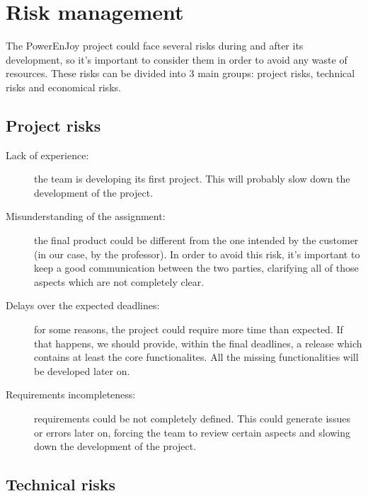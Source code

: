 \section{Risk management}

The PowerEnJoy project could face several risks during and after its development, so it's important to consider them in order to avoid any waste of resources. These risks can be divided into 3 main groups: project risks, technical risks and economical risks.

\subsection {Project risks}

\begin{description}
	\item [Lack of experience: ] the team is developing its first project. This will probably slow down the development of the project.
	\item [Misunderstanding of the assignment: ] the final product could be different from the one intended by the customer (in our case, by the professor). In order to avoid this risk, it's important to keep a good communication between the two parties, clarifying all of those aspects which are not completely clear.
	\item [Delays over the expected deadlines: ] for some reasons, the project could require more time than expected. If that happens, we should provide, within the final deadlines, a release which contains at least the core functionalites. All the missing functionalities will be developed later on.
	\item [Requirements incompleteness: ] requirements could be not completely defined. This could generate issues or errors later on, forcing the team to review certain aspects and slowing down the development of the project.
\end{description}

\subsection {Technical risks}

